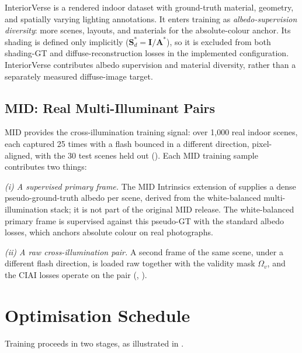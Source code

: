 InteriorVerse  is a rendered indoor dataset with
ground-truth material, geometry, and spatially varying lighting annotations.
It enters training as \emph{albedo-supervision diversity}: more scenes, layouts,
and materials for the absolute-colour anchor.
Its shading is defined only implicitly ($\mathbf{S}^*_d = \mathbf{I}/\mathbf{A}^*$),
so it is excluded from both shading-GT and diffuse-reconstruction losses in the
implemented configuration. InteriorVerse contributes albedo supervision and
material diversity, rather than a separately measured diffuse-image target.

\subsection{MID: Real Multi-Illuminant Pairs}

MID  provides the cross-illumination training signal: over
1{,}000 real indoor scenes, each captured 25 times with a flash bounced in a
different direction, pixel-aligned, with the 30 test scenes held out
().
Each MID training sample contributes two things:

\emph{(i) A supervised primary frame.}
The MID Intrinsics extension of  supplies a dense
pseudo-ground-truth albedo per scene, derived from the white-balanced
multi-illumination stack; it is not part of the original MID release.
The white-balanced primary frame is supervised against this pseudo-GT with the
standard albedo losses, which anchors absolute colour on real photographs.

\emph{(ii) A raw cross-illumination pair.}
A second frame of the same scene, under a different flash direction, is loaded raw
together with the validity mask $\Omega_v$, and the CIAI losses operate on the pair
(, ).


\section{Optimisation Schedule}
\label{sec:schedule}

Training proceeds in two stages, as illustrated in .

